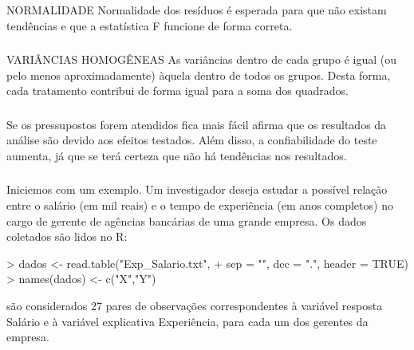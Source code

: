 \documentclass[14pt,aspectratio=1610]{beamer}
\begin{document}
\begin{frame}{}
\frametitle{ }
\begin{block}{NORMALIDADE}
\justifying
Normalidade dos resíduos é esperada para que não existam tendências e que a estatística F funcione de forma correta.
\end{block}
\end{frame}

\begin{frame}{}
\frametitle{ }
\begin{block}{VARIÂNCIAS HOMOGÊNEAS}
\justifying
As variâncias dentro de cada grupo é igual (ou pelo menos aproximadamente) àquela dentro de todos os grupos. Desta forma, cada tratamento contribui de forma igual para a soma dos quadrados.
\end{block}
\end{frame}

\begin{frame}{}
\frametitle{ }
\begin{block}{}
\justifying
Se os pressupostos forem atendidos fica mais fácil afirma que os resultados da análise são devido aos efeitos testados. Além disso, a confiabilidade do teste aumenta, já que se terá certeza que não há tendências nos resultados.
\end{block}
\end{frame}

\begin{frame}[fragile]{}
\frametitle{ }
\begin{block}{}
\justifying
Iniciemos com um exemplo. Um investigador deseja estudar a possível relação entre o salário (em mil reais) e o tempo de experiência (em anos completos) no cargo de gerente de agências bancárias de uma grande empresa. Os dados coletados são lidos no R:
\end{block}
\begin{block}{}
\begin{Schunk}
\begin{Sinput}
> dados <- read.table("Exp_Salario.txt", 
+                     sep = "", dec = ".", header = TRUE)
> names(dados) <- c("X","Y")
\end{Sinput}
\end{Schunk}
\end{block}\pause
\begin{block}{}
são considerados 27 pares de observações correspondentes à variável resposta Salário e à variável explicativa Experiência, para cada um dos gerentes da empresa.
\end{block}
\end{frame}
\end{document}
